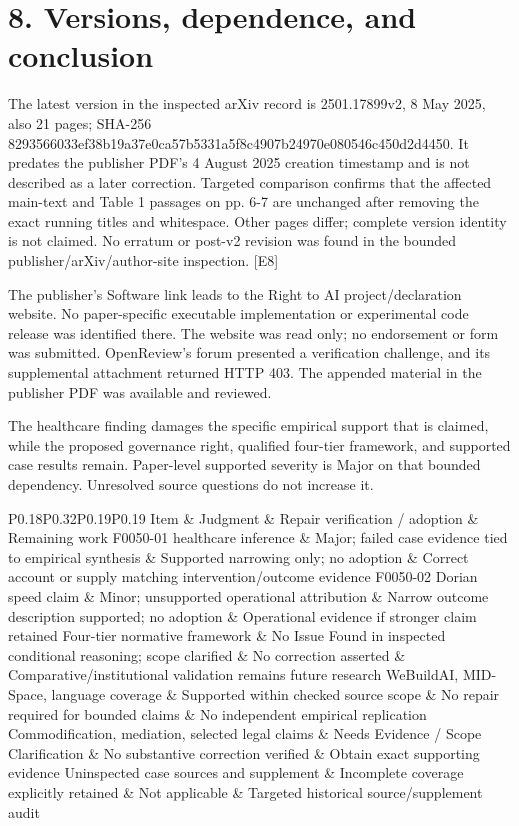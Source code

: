 \documentclass[10pt]{article}
\begin{document}
\section*{8. Versions, dependence, and conclusion}
The latest version in the inspected arXiv record is 2501.17899v2, 8 May 2025, also 21 pages; SHA-256 8293566033ef38b19a37e0ca57b5331a5f8c4907b24970e080546c450d2d4450. It predates the publisher PDF’s 4 August 2025 creation timestamp and is not described as a later correction. Targeted comparison confirms that the affected main-text and Table 1 passages on pp. 6-7 are unchanged after removing the exact running titles and whitespace. Other pages differ; complete version identity is not claimed. No erratum or post-v2 revision was found in the bounded publisher/arXiv/author-site inspection. [E8]\par
The publisher’s Software link leads to the Right to AI project/declaration website. No paper-specific executable implementation or experimental code release was identified there. The website was read only; no endorsement or form was submitted. OpenReview’s forum presented a verification challenge, and its supplemental attachment returned HTTP 403. The appended material in the publisher PDF was available and reviewed.\par
The healthcare finding damages the specific empirical support that is claimed, while the proposed governance right, qualified four-tier framework, and supported case results remain. Paper-level supported severity is Major on that bounded dependency. Unresolved source questions do not increase it.\par
P0.18P0.32P0.19P0.19 Item \& Judgment \& Repair verification / adoption \& Remaining work
F0050-01 healthcare inference \& Major; failed case evidence tied to empirical synthesis \& Supported narrowing only; no adoption \& Correct account or supply matching intervention/outcome evidence
F0050-02 Dorian speed claim \& Minor; unsupported operational attribution \& Narrow outcome description supported; no adoption \& Operational evidence if stronger claim retained
Four-tier normative framework \& No Issue Found in inspected conditional reasoning; scope clarified \& No correction asserted \& Comparative/institutional validation remains future research
WeBuildAI, MID-Space, language coverage \& Supported within checked source scope \& No repair required for bounded claims \& No independent empirical replication
Commodification, mediation, selected legal claims \& Needs Evidence / Scope Clarification \& No substantive correction verified \& Obtain exact supporting evidence
Uninspected case sources and supplement \& Incomplete coverage explicitly retained \& Not applicable \& Targeted historical source/supplement audit\par
\end{document}
